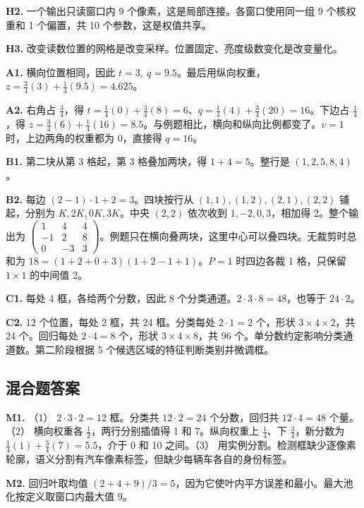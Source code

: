 \documentclass[UTF8,a4paper,11pt]{ctexart}
\begin{document}
\textbf{H2.} 一个输出只读窗口内 9 个像素，这是局部连接。各窗口使用同一组 9 个核权重和 1 个偏置，共 10 个参数，这是权值共享。

\textbf{H3.} 改变读数位置的网格是改变采样。位置固定、亮度级数变化是改变量化。

\textbf{A1.} 横向位置相同，因此 $t=3,\ q=9.5$。最后用纵向权重，$z=\frac34(3)+\frac14(9.5)=4.625$。

\textbf{A2.} 右角占 $\frac34$，得 $t=\frac14(0)+\frac34(8)=6$、$q=\frac14(4)+\frac34(20)=16$。下边占 $\frac14$，得 $z=\frac34(6)+\frac14(16)=8.5$。与例题相比，横向和纵向比例都变了。$v=1$ 时，上边两角的权重都为 0，直接得 $q=16$。

\textbf{B1.} 第二块从第 3 格起，第 3 格叠加两块，得 $1+4=5$。整行是 $(1,2,5,8,4)$。

\textbf{B2.} 每边 $(2-1)\cdot1+2=3$。四块按行从 $(1,1),(1,2),(2,1),(2,2)$ 铺起，分别为 $K,2K,0K,3K$。中央 $(2,2)$ 依次收到 $1,-2,0,3$，相加得 2。整个输出为 $\begin{pmatrix}1&4&4\\-1&2&8\\0&-3&3\end{pmatrix}$。例题只在横向叠两块，这里中心可以叠四块。无裁剪时总和为 $18=(1+2+0+3)(1+2-1+1)$。$P=1$ 时四边各裁 1 格，只保留 $1\times1$ 的中间值 2。

\textbf{C1.} 每处 4 框，各给两个分数，因此 8 个分类通道。$2\cdot3\cdot8=48$，也等于 $24\cdot2$。

\textbf{C2.} 12 个位置，每处 2 框，共 24 框。分类每处 $2\cdot1=2$ 个，形状 $3\times4\times2$，共 24 个。回归每处 $2\cdot4=8$ 个，形状 $3\times4\times8$，共 96 个。单分数约定影响分类通道数。第二阶段根据 5 个候选区域的特征判断类别并微调框。

\clearpage
\subsection{混合题答案}
\textbf{M1.} （1） $2\cdot3\cdot2=12$ 框。分类共 $12\cdot2=24$ 个分数，回归共 $12\cdot4=48$ 个量。（2） 横向权重各 $\frac12$，两行分别插值得 1 和 7。纵向权重上 $\frac14$、下 $\frac34$，新分数为 $\frac14(1)+\frac34(7)=5.5$，介于 0 和 10 之间。（3） 用实例分割。检测框缺少逐像素轮廓，语义分割有汽车像素标签，但缺少每辆车各自的身份标签。

\textbf{M2.} 回归叶取均值 $(2+4+9)/3=5$，因为它使叶内平方误差和最小。最大池化按定义取窗口内最大值 9。
\end{document}
